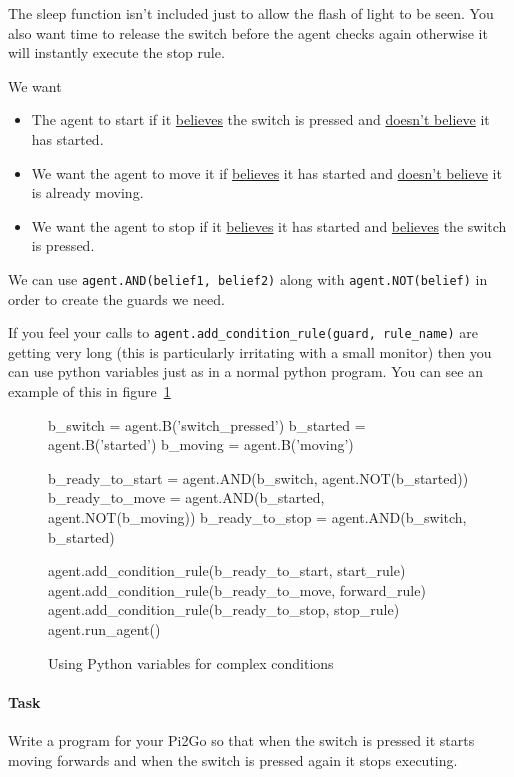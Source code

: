 \documentclass[a4,12pt]{article}
\begin{document}
The sleep function isn't included just to allow the flash of light to be seen.  You also want time to release the switch before the agent checks again otherwise it will instantly execute the stop rule.

We want
\begin{itemize}
\item The agent to start if it \underline{believes} the switch is pressed and \underline{doesn't believe} it has started.
\item We want the agent to move it if \underline{believes} it has started and \underline{doesn't believe} it is already moving.
  \item We want the agent to stop if it \underline{believes} it has started and \underline{believes} the switch is pressed.
\end{itemize}

We can use \lstinline{agent.AND(belief1, belief2)} along with \lstinline{agent.NOT(belief)} in order to create the guards we need.

If you feel your calls to \lstinline{agent.add_condition_rule(guard, rule_name)} are getting very long (this is particularly irritating with a small monitor) then you can use python variables just as in a normal python program.  You can see an example of this in figure~\ref{code:variables}

\begin{figure}[htbp]
  \begin{pythonlisting}
b_switch = agent.B('switch_pressed')
b_started = agent.B('started')
b_moving = agent.B('moving')

b_ready_to_start = agent.AND(b_switch, agent.NOT(b_started))
b_ready_to_move = agent.AND(b_started, agent.NOT(b_moving))
b_ready_to_stop = agent.AND(b_switch, b_started)

agent.add_condition_rule(b_ready_to_start, start_rule)
agent.add_condition_rule(b_ready_to_move, forward_rule)
agent.add_condition_rule(b_ready_to_stop, stop_rule)
agent.run_agent()
  \end{pythonlisting}
  \caption{Using Python variables for complex conditions}
  \label{code:variables}
\end{figure}

\paragraph{Task} Write a program for your Pi2Go so that when the switch is pressed it starts moving forwards and when the switch is pressed again it stops executing.
\end{document}
